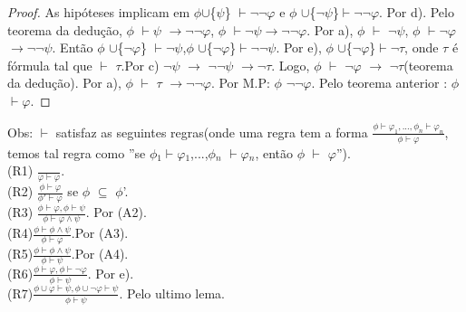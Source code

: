 \documentclass[12pt]{report}
\begin{document}
\begin{proof} As hipóteses implicam em $\phi$$\cup$\{$\psi$\} $\vdash$$\neg$$\neg$$\varphi$ e $\phi$ $\cup$\{$\neg$$\psi$\}$\vdash$$\neg$$\neg$$\varphi$. Por d). Pelo teorema da dedução, $\phi$ $\vdash$$\psi$ $\rightarrow$$\neg$$\neg$$\varphi$, $\phi$ $\vdash$$\neg$$\psi$$\rightarrow$$\neg$$\neg$$\varphi$. Por a), $\phi$ $\vdash$ $\neg$$\psi$, $\phi$ $\vdash$$\neg$$\varphi$$\rightarrow$$\neg$$\neg$$\psi$. Então  $\phi$ $\cup$\{$\neg$$\varphi$\} $\vdash$$\neg$$\psi$,$\phi$ $\cup$\{$\neg$$\varphi$\}$\vdash$$\neg$$\neg$$\psi$. Por e), $\phi$ $\cup$\{$\neg$$\varphi$\}$\vdash$$\neg$$\tau$, onde $\tau$ é fórmula tal que $\vdash$ $\tau$.Por c) $\neg$$\psi$ $\rightarrow$ $\neg$$\neg$$\psi$ $\rightarrow$$\neg$$\tau$. Logo, $\phi$ $\vdash$ $\neg$$\varphi$ $\rightarrow$ $\neg$$\tau$(teorema da dedução). Por a), $\phi$  $\vdash$ $\tau$ $\rightarrow$$\neg$$\neg$$\varphi$. Por M.P: $\phi$ $\neg$$\neg$$\varphi$. Pelo teorema anterior : $\phi$$\vdash$$\varphi$.\end{proof}
Obs: $\vdash$ satisfaz as seguintes regras(onde uma regra tem a forma $ \frac {\phi \vdash \varphi_{1},...,\phi_{n} \vdash \varphi_{n}}{\phi\vdash\varphi}$, temos tal regra como ''se $\phi$$_{1}$$\vdash$$\varphi$$_{1}$,...,$\phi$$_{n}$ $\vdash$$\varphi$$_{n}$, então $\phi$ $\vdash$ $\varphi$'').\\
(R1) $\frac{}{\varphi\vdash\varphi}$.\\
(R2) $\frac{\phi \vdash \varphi}{\phi'\vdash \varphi}$ se $\phi$ $\subseteq$ $\phi$'.\\
(R3) $ \frac{\phi \vdash \varphi,\phi \vdash \psi}{\phi \vdash \varphi \land\psi}$. Por (A2).\\
(R4)$ \frac {\phi \vdash \phi \land \psi}{\phi \vdash \varphi}$.Por (A3).\\
(R5)$ \frac {\phi \vdash \phi \land \psi}{\phi\vdash \psi }$.Por (A4).\\
(R6)$ \frac {\phi \vdash \varphi, \phi \vdash \neg \varphi}{\phi \vdash \psi }$. Por e).\\
(R7)$ \frac {\phi \cup {\varphi} \vdash \psi,\phi \cup {\neg\varphi} \vdash \psi}{\phi \vdash \psi}$. Pelo ultimo lema.\\
\end{document}
